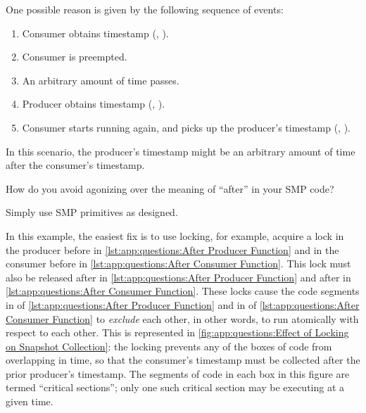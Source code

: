 \begin{fcvref}
One possible reason is given by the following sequence of events:
\begin{enumerate}
\item	Consumer obtains timestamp
	(,
	).
\item	Consumer is preempted.
\item	An arbitrary amount of time passes.
\item	Producer obtains timestamp
	(,
	).
\item	Consumer starts running again, and picks up the producer's
	timestamp
	(,
	).
\end{enumerate}

In this scenario, the producer's timestamp might be an arbitrary
amount of time after the consumer's timestamp.

How do you avoid agonizing over the meaning of ``after'' in your
SMP code?

Simply use SMP primitives as designed.

In this example, the easiest fix is to use locking, for example,
acquire a lock in the producer before  in
\cref{lst:app:questions:After Producer Function} and in
the consumer before  in
\cref{lst:app:questions:After Consumer Function}.
This lock must also be released after  in
\cref{lst:app:questions:After Producer Function} and
after  in
\cref{lst:app:questions:After Consumer Function}.
These locks cause the code segments in
 of
\cref{lst:app:questions:After Producer Function} and in
 of
\cref{lst:app:questions:After Consumer Function} to {\em exclude}
each other, in other words, to run atomically with respect to each other.
This is represented in
\cref{fig:app:questions:Effect of Locking on Snapshot Collection}:
the locking prevents any of the boxes of code from overlapping in time, so
that the consumer's timestamp must be collected after the prior
producer's timestamp.
The segments of code in each box in this figure are termed
``critical sections''; only one such critical section may be executing
at a given time.
\end{fcvref}

